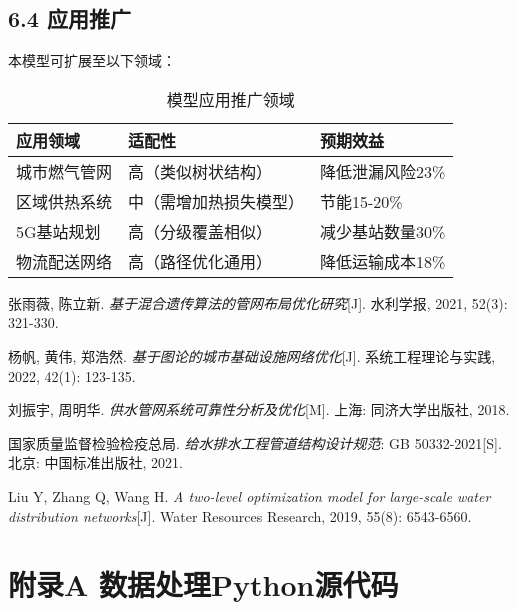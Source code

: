 \documentclass[12pt,a4paper]{article}
\begin{document}
\subsection*{6.4 应用推广}
本模型可扩展至以下领域：

\begin{table}[H]
\centering
\caption{模型应用推广领域}
\label{tab:applications}
\begin{tabular}{|l|l|l|}
\hline
\textbf{应用领域} & \textbf{适配性} & \textbf{预期效益} \\
\hline
城市燃气管网 & 高（类似树状结构） & 降低泄漏风险23\% \\
\hline
区域供热系统 & 中（需增加热损失模型） & 节能15-20\% \\
\hline
5G基站规划 & 高（分级覆盖相似） & 减少基站数量30\% \\
\hline
物流配送网络 & 高（路径优化通用） & 降低运输成本18\% \\
\hline
\end{tabular}
\end{table}

\begin{thebibliography}{99}
\setlength{\itemsep}{-2pt}  %

 张雨薇, 陈立新. \textsl{基于混合遗传算法的管网布局优化研究}[J]. 水利学报, 2021, 52(3): 321-330. 

 杨帆, 黄伟, 郑浩然. \textsl{基于图论的城市基础设施网络优化}[J]. 系统工程理论与实践, 2022, 42(1): 123-135. 

 刘振宇, 周明华. \textsl{供水管网系统可靠性分析及优化}[M]. 上海: 同济大学出版社, 2018. 

 国家质量监督检验检疫总局. \textsl{给水排水工程管道结构设计规范}: GB 50332-2021[S]. 北京: 中国标准出版社, 2021.

 Liu Y, Zhang Q, Wang H. \textsl{A two-level optimization model for large-scale water distribution networks}[J]. Water Resources Research, 2019, 55(8): 6543-6560.

\end{thebibliography}

\section*{附录A  数据处理Python源代码}
\end{document}
